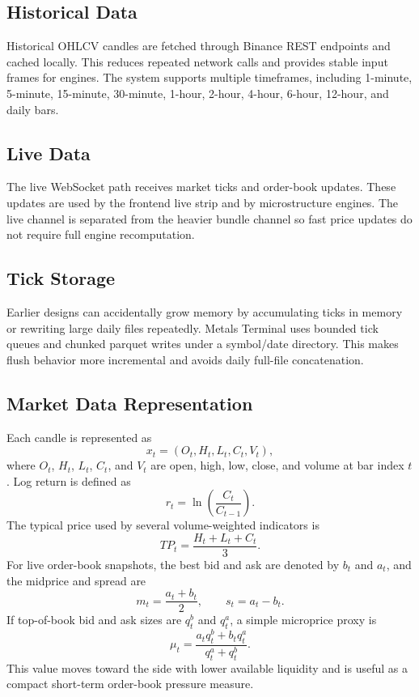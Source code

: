 \documentclass[conference]{IEEEtran}
\begin{document}
\subsection{Historical Data}

Historical OHLCV candles are fetched through Binance REST endpoints and
cached locally. This reduces repeated network calls and provides stable input
frames for engines. The system supports multiple timeframes, including
1-minute, 5-minute, 15-minute, 30-minute, 1-hour, 2-hour, 4-hour, 6-hour,
12-hour, and daily bars.

\subsection{Live Data}

The live WebSocket path receives market ticks and order-book updates. These
updates are used by the frontend live strip and by microstructure engines.
The live channel is separated from the heavier bundle channel so fast price
updates do not require full engine recomputation.

\subsection{Tick Storage}

Earlier designs can accidentally grow memory by accumulating ticks in memory
or rewriting large daily files repeatedly. Metals Terminal uses bounded tick
queues and chunked parquet writes under a symbol/date directory. This makes
flush behavior more incremental and avoids daily full-file concatenation.

\subsection{Market Data Representation}

Each candle is represented as
\begin{equation}
x_t = (O_t,H_t,L_t,C_t,V_t),
\end{equation}
where $O_t$, $H_t$, $L_t$, $C_t$, and $V_t$ are open, high, low, close, and
volume at bar index $t$. Log return is defined as
\begin{equation}
r_t = \ln\left(\frac{C_t}{C_{t-1}}\right).
\end{equation}
The typical price used by several volume-weighted indicators is
\begin{equation}
TP_t = \frac{H_t+L_t+C_t}{3}.
\end{equation}
For live order-book snapshots, the best bid and ask are denoted by $b_t$ and
$a_t$, and the midprice and spread are
\begin{equation}
m_t = \frac{a_t+b_t}{2}, \qquad s_t = a_t-b_t.
\end{equation}
If top-of-book bid and ask sizes are $q_t^b$ and $q_t^a$, a simple
microprice proxy is
\begin{equation}
\mu_t = \frac{a_t q_t^b + b_t q_t^a}{q_t^a+q_t^b}.
\end{equation}
This value moves toward the side with lower available liquidity and is useful
as a compact short-term order-book pressure measure.
\end{document}
